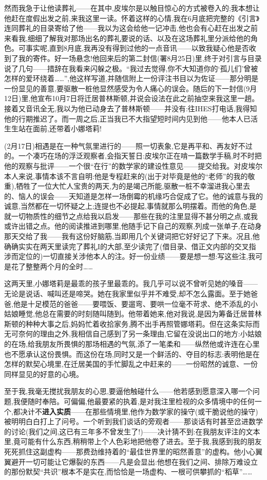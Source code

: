 然而我急于让他读葬礼——在其中,皮埃尔是以触目惊心的方式被卷入的;我本想让他赶在度假出发之前,来我这里一读。怀着这样的心情,我在6月底把完整的《引言》连同葬礼的目录寄给了他——我以为这会给他一记冲击,他也会\dmark{}有心赶在出发之前来看我,细细了解我对那场出名的葬礼要说的话、以及在这场葬礼里分派给他的角色。可事实呢,直到8月底,我再没有得到过他的一点音讯——以致我疑心他是否收到了我的寄件。好一场悬念!他回来后的第二封信(署8月25日)里,终于对引言与目录说了几句——措辞在我看来闪躲之极。“我过去觉得,你不大知道你的‘孤儿们’曾被怎样的爱环绕着……”,他这样写道,并随信附上一份评注书目以为佐证——那分明是一份显见的善意,要驱散一桩他显然感受为令人痛心的误会。随后的下一封信(9月12日)里,他宣布10月7日将迁居普林斯顿,并说会设法在此之前抽空来我这里一趟。接着又音讯全无,我以为他已动身去了普林斯顿——并没有:往IHES打电话,我得知他的行期推迟了。而一周之后,正当我已不大指望短时间内见到他——他本人已活生生站在面前,还带着小娜塔莉!

(2月17日)相遇是在一种气氛里进行的——照一切表象,它是再平和、再友好不过的。一个凑巧在场的浮泛观察者,会指天誓日:皮埃尔正在啃一篇数学手稿,时不时把他的观察与批评——一个很“在行”的数学家的建设性意见——提交给我。对皮埃尔本人来说,事情本该不言自明:他是专程赶来的(出于对毕竟是他的“老师”的我的敬重),牺牲了一位大忙人宝贵的两天,为的是竭己所能,驱散一桩不幸溜进我心里去的、恼人的误会——天知道是怎样一场倒霉的机缘巧合促成了它。他的诚意与我的诚意,当然都在一切怀疑之上;连提也不必提起,事情就那么明摆着。而他的角色,是就一切物质性的细节之点给我以启发——那些在我的注里显得不甚分明之点,或我或许出错之点。他的阅读推进到哪里,他随手记下自己的观察,列成一张单子,在动身那天交给了我——我有这份好脑筋,当即用几个关键词把它好好记了下来。况且,他确确实实在两天里读完了葬礼I的大部,至少读完了(借目录、借正文内部的交叉指涉而定位的)一切直接关涉他本人的注。好一份\dmark{}业绩——要是想一想:写这些注,我可是花了整整两个月的全时……

这两天里,小娜塔莉是最乖的孩子里最乖的。我几乎可以说不曾听见她的嗓音——无论是说话、喊叫还是啼哭。她在我家里似乎并不难受,却不怎么露面。至于她爸爸,他是十足模范的爸爸——要喂饭、要遛弯、要哄一位毫不苛求、绝不添乱的小姑娘睡觉,他总在需要的时刻随叫随到。他带着她来,他对我说,是因为筹备迁居普林斯顿的种种大事之后,妈妈忙着收拾家务,腾不出手再照管娜塔莉。但在这条实际而无可奈何的理由之外,我相信自己感到了另一条理由,它留在没说出口的地方:小姑娘的在场,给我朋友所畏惧的那场相遇的气氛,添了一笔柔和——纵然他或许连在心里也不愿承认这份畏惧。而这份在场,同时又是一个鲜活的、夺目的标志:表明他是在怎样的默契心境里,在迁居美国的手忙脚乱之中赶来的——一份昭然的诚意、一份同样显见的好意的心境。

至于我,我毫无搅扰我朋友的心思,要逼他触碰什么——他若感到愿意深入哪一个问题,我便随时奉陪。可偏偏,他最要紧的执着,是对我注里检视的众多情境中的任何一个,都决计不\textbf{进入实质}——在那些情境里,他作为数学家的操守(或干脆说他的操守)被明明白白打上了问号。一个听到我们谈话的旁观者——那谈话有时甚至岔进数学的讨论(我们之间,这已有三年多不曾发生了!)——决计猜不到:在我朋友评注的文本里,竟可能有什么东西,稍稍带上个人色彩地把他卷了进去。至于我,我感到我的朋友死死抓住这副虚构——那费劲维持着的“最佳世界里的昭然善意”的虚构。他小心翼翼避开一切可能让它爆裂的东西——凡是会显出:他想在我们之间、排除万难设立的那份默契“共识”根本不是实在,而恰恰是一场虚构、一根可供攀抓的“稻草”……

